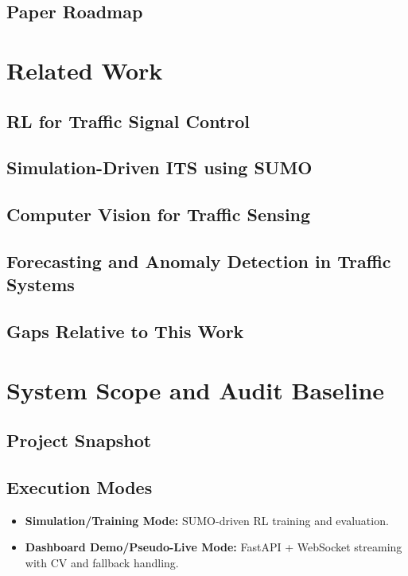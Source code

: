 \documentclass[conference]{IEEEtran}
\begin{document}
\subsection{Paper Roadmap}

\section{Related Work}
\subsection{RL for Traffic Signal Control}

\subsection{Simulation-Driven ITS using SUMO}

\subsection{Computer Vision for Traffic Sensing}

\subsection{Forecasting and Anomaly Detection in Traffic Systems}

\subsection{Gaps Relative to This Work}

\section{System Scope and Audit Baseline}
\subsection{Project Snapshot}

\subsection{Execution Modes}
\begin{itemize}[leftmargin=*]
	\item \textbf{Simulation/Training Mode:} SUMO-driven RL training and evaluation.
	\item \textbf{Dashboard Demo/Pseudo-Live Mode:} FastAPI + WebSocket streaming with CV and fallback handling.
\end{itemize}
\end{document}
